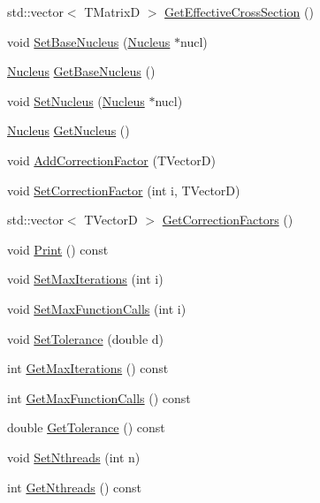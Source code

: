 \begin{DoxyCompactItemize}
std\-::vector$<$ T\-Matrix\-D $>$ \hyperlink{classCoulExFitter_ac7290cf5ca6893275050ef26161b2832}{Get\-Effective\-Cross\-Section} ()
\item 
void \hyperlink{classCoulExFitter_a1c7724db2db1fd9c41e7daf28cbf5271}{Set\-Base\-Nucleus} (\hyperlink{classNucleus}{Nucleus} $\ast$nucl)
\item 
\hyperlink{classNucleus}{Nucleus} \hyperlink{classCoulExFitter_a70183f69951d7277f9b183f820210971}{Get\-Base\-Nucleus} ()
\item 
void \hyperlink{classCoulExFitter_a099e738fd3b6b62355db787c8268cd15}{Set\-Nucleus} (\hyperlink{classNucleus}{Nucleus} $\ast$nucl)
\item 
\hyperlink{classNucleus}{Nucleus} \hyperlink{classCoulExFitter_a0c587c7748683456fd558bad426c1fe1}{Get\-Nucleus} ()
\item 
void \hyperlink{classCoulExFitter_acd5ed89489dfbb4ec2a480d5ae933b04}{Add\-Correction\-Factor} (T\-Vector\-D)
\item 
void \hyperlink{classCoulExFitter_aec7d01311ac98f4e6a909cc76ee79a1a}{Set\-Correction\-Factor} (int i, T\-Vector\-D)
\item 
std\-::vector$<$ T\-Vector\-D $>$ \hyperlink{classCoulExFitter_ac99895ede79f2918b619f1def61ee768}{Get\-Correction\-Factors} ()
\item 
void \hyperlink{classCoulExFitter_a92e5a9e3b4fbbf8d3df93543d2bf00c5}{Print} () const 
\item 
void \hyperlink{classCoulExFitter_af64c86ac6a7c93c8bc5cbe45f072afb3}{Set\-Max\-Iterations} (int i)
\item 
void \hyperlink{classCoulExFitter_aa4176694fecb8647bf90443c0be564d4}{Set\-Max\-Function\-Calls} (int i)
\item 
void \hyperlink{classCoulExFitter_a9abeddb0f114d7dcc70309f03f54dd01}{Set\-Tolerance} (double d)
\item 
int \hyperlink{classCoulExFitter_abc2b196c4245b5c6f019a8a1f45eb00e}{Get\-Max\-Iterations} () const 
\item 
int \hyperlink{classCoulExFitter_a96352023871d7431849e35c23a59ee48}{Get\-Max\-Function\-Calls} () const 
\item 
double \hyperlink{classCoulExFitter_a6b78c02a350d2cdcaa42e105aab4cf88}{Get\-Tolerance} () const 
\item 
void \hyperlink{classCoulExFitter_a5ed39b91e4a9db0b148e3854dcf05d07}{Set\-Nthreads} (int n)
\item 
int \hyperlink{classCoulExFitter_a9e65723ca1492e71bd7f1ff9b457c1fb}{Get\-Nthreads} () const 

\end{DoxyCompactItemize}
